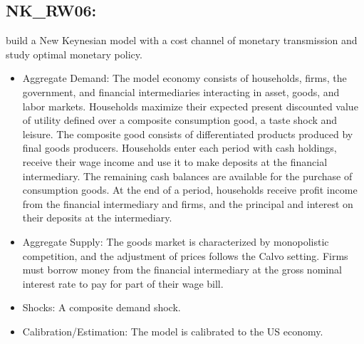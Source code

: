 \documentclass[11pt,a4paper]{article}
\begin{document}
	\subsection{NK\_RW06: \texorpdfstring{\cite{RavennaWalsh2006}}{Ravenna and Walsh (2006)}}
	\label{NKRW06}
	\cite{RavennaWalsh2006} build a New Keynesian model with a cost channel of monetary transmission and study optimal monetary policy.
	\begin{itemize}
		
		\item Aggregate Demand: The model economy consists of households, firms, the government, and financial intermediaries interacting in asset, goods, and labor markets. Households maximize their expected present discounted value of utility defined over a composite consumption good, a taste shock and leisure. The composite good consists of differentiated products produced by final goods producers. Households enter each period with cash holdings, receive their wage income and use it to make deposits at the financial intermediary. The remaining cash balances are available for the purchase of consumption goods. At the end of a period, households receive profit income from the financial intermediary and firms, and the principal and interest on their deposits at the intermediary.
		
		\item Aggregate Supply: The goods market is characterized by monopolistic competition, and the adjustment of prices follows the Calvo setting. Firms must borrow money from the financial intermediary at the gross nominal interest rate to pay for part of their wage bill.
		
		\item Shocks: A composite demand shock.
		
		\item Calibration/Estimation: The model is calibrated to the US economy.
		
		
		
	\end{itemize}
	
	
\end{document}
